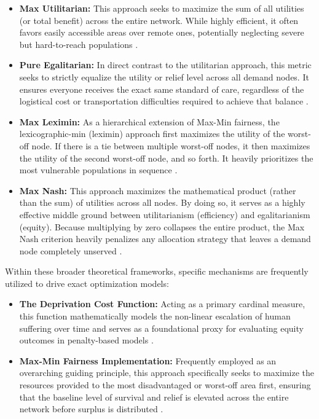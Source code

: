 \begin{itemize}
    \item \textbf{Max Utilitarian:} This approach seeks to maximize the sum of all utilities (or total benefit) across the entire network. While highly efficient, it often favors easily accessible areas over remote ones, potentially neglecting severe but hard-to-reach populations \cite{vitoriano2011}.
    \item \textbf{Pure Egalitarian:} In direct contrast to the utilitarian approach, this metric seeks to strictly equalize the utility or relief level across all demand nodes. It ensures everyone receives the exact same standard of care, regardless of the logistical cost or transportation difficulties required to achieve that balance \cite{vitoriano2011}.
    \item \textbf{Max Leximin:} As a hierarchical extension of Max-Min fairness, the lexicographic-min (leximin) approach first maximizes the utility of the worst-off node. If there is a tie between multiple worst-off nodes, it then maximizes the utility of the second worst-off node, and so forth. It heavily prioritizes the most vulnerable populations in sequence \cite{vitoriano2011}.
    \item \textbf{Max Nash:} This approach maximizes the mathematical product (rather than the sum) of utilities across all nodes. By doing so, it serves as a highly effective middle ground between utilitarianism (efficiency) and egalitarianism (equity). Because multiplying by zero collapses the entire product, the Max Nash criterion heavily penalizes any allocation strategy that leaves a demand node completely unserved \cite{vitoriano2011}.
\end{itemize}

Within these broader theoretical frameworks, specific mechanisms are frequently utilized to drive exact optimization models:

\begin{itemize}
    \item \textbf{The Deprivation Cost Function:} Acting as a primary cardinal measure, this function mathematically models the non-linear escalation of human suffering over time and serves as a foundational proxy for evaluating equity outcomes in penalty-based models \cite{gutjahr2018, li2021pre}.
    \item \textbf{Max-Min Fairness Implementation:} Frequently employed as an overarching guiding principle, this approach specifically seeks to maximize the resources provided to the most disadvantaged or worst-off area first, ensuring that the baseline level of survival and relief is elevated across the entire network before surplus is distributed \cite{vitoriano2011, lin2011}.
\end{itemize}

